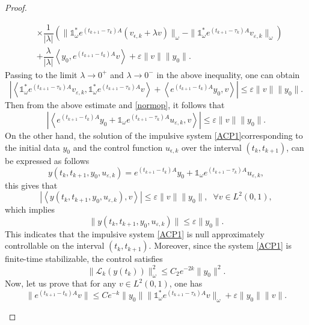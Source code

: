 \documentclass[10pt,a4paper]{amsart}
\begin{document}
\begin{proof}
\begin{enumerate}
\begin{align*}
        &\times \dfrac{1}{\left\lvert \lambda \right\rvert} \left(\| \mathds{1}_{\omega}^{*} e^{(t_{k+1}-\tau_k)A} (v_{\epsilon,k}+\lambda v)\|_{\omega} -\| \mathds{1}_{\omega}^{*} e^{(t_{k+1}-\tau_k)A} v_{\varepsilon,k}\|_{\omega} \right)\nonumber\\
        &+ \dfrac{\lambda}{\left\lvert\lambda \right\rvert} \left\langle y_0, e^{(t_{k+1}-t_k)A} v \right\rangle +  \varepsilon \|v\| \|y_0\|.
    \end{align*}
    Passing to the limit $\lambda \to 0^{+}$ and $\lambda \to 0^{-}$ in the above inequality, one can obtain 
    \begin{equation*}
        \left\lvert \left\langle \mathds{1}_{\omega}^{*} e^{(t_{k+1}-\tau_k)A} v_{\varepsilon,k} , \mathds{1}_{\omega}^{*} e^{(t_{k+1}-\tau_k)A} v\right\rangle+ \left\langle e^{(t_{k+1}-t_k)A} y_0,  v \right\rangle \right\rvert \leq \varepsilon \| v\| \|y_0\|.
    \end{equation*}
    Then from the above estimate and \eqref{normop}, it follows that
    \begin{equation}
        \left\lvert \left\langle e^{(t_{k+1}-t_k)A} y_0 + \mathds{1}_{\omega} e^{(t_{k+1}-\tau_k)A} u_{\varepsilon,k} , v \right\rangle \right\rvert \leq \varepsilon \| v \| \|y_0\|.
    \end{equation}
    On the other hand, the solution of the impulsive system \eqref{ACP1}corresponding to the initial data $y_0$ and the control function $u_{\epsilon,k}$ over the interval $(t_k, t_{k+1})$, can be expressed as follows
    \[y(t_k,t_{k+1},y_0,u_{\varepsilon,k})= e^{(t_{k+1}-t_k)A} y_0 + \mathds{1}_{\omega} e^{(t_{k+1}-\tau_k)A} u_{\varepsilon,k},\]
    this gives that
    \[\left\lvert \left\langle y(t_k,t_{k+1},y_0,u_{\varepsilon,k}) , v \right\rangle \right\rvert \leq \varepsilon \| v \| \|y_0\|, \;\;\forall v \in L^2(0,1),\]
    which implies 
    \begin{equation}\label{eqq8}
        \| y(t_k,t_{k+1}, y_0, u_{\varepsilon,k}) \| \leq \varepsilon \|y_0\|.
    \end{equation}
    This indicates that the impulsive system \eqref{ACP1} is null approximately controllable on the interval $(t_k, t_{k+1})$. Moreover, since the system \eqref{ACP1} is finite-time stabilizable, the control satisfies
    \[ \| \mathcal{L}_k(y(t_k)) \|^2_{\omega} \leq C_2 e^{-2k} \|y_0\|^2.\]
    Now, let us prove that for any $v \in L^2(0,1)$, one has
    \begin{equation}\label{eqq13}
        \| e^{(t_{k+1}-t_k)A} v \| \leq C e^{-k} \|y_0\|\| \mathds{1}_{\omega}^{*} e^{(t_{k+1}-\tau_k)A} v \|_{\omega} + \varepsilon\|y_0\| \| v\|.

\end{equation}
\end{enumerate}
\end{proof}
\end{document}
